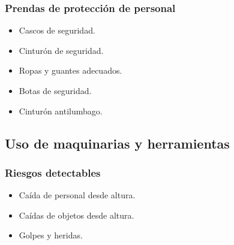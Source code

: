 \subsubsection{Prendas de protección de personal}
\label{subsubsec:sysHerrajes-EPI}
\begin{itemize}
    \item Cascos de seguridad.
    \item Cinturón de seguridad.
    \item Ropas y guantes adecuados.
    \item Botas de seguridad.
    \item Cinturón antilumbago.
\end{itemize}
\subsection{Uso de maquinarias y herramientas}
\label{subsec:sys-riesgosMaquinaria}
\subsubsection{Riesgos detectables}
\label{subsubsec:sysMaquinaria-RD}
\begin{itemize}
    \item Caída de personal desde altura.
    \item Caídas de objetos desde altura.
    \item Golpes y heridas.
\end{itemize}
